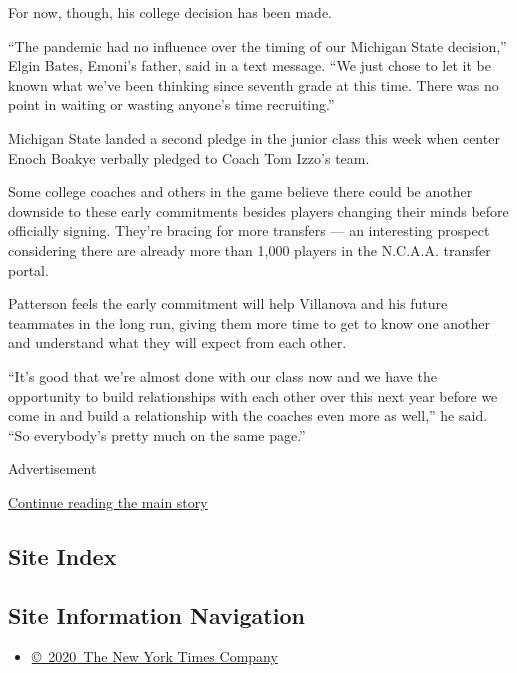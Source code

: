 For now, though, his college decision has been made.

``The pandemic had no influence over the timing of our Michigan State
decision,'' Elgin Bates, Emoni's father, said in a text message. ``We
just chose to let it be known what we've been thinking since seventh
grade at this time. There was no point in waiting or wasting anyone's
time recruiting.''

Michigan State landed a second pledge in the junior class this week when
center Enoch Boakye verbally pledged to Coach Tom Izzo's team.

Some college coaches and others in the game believe there could be
another downside to these early commitments besides players changing
their minds before officially signing. They're bracing for more
transfers --- an interesting prospect considering there are already more
than 1,000 players in the N.C.A.A. transfer portal.

Patterson feels the early commitment will help Villanova and his future
teammates in the long run, giving them more time to get to know one
another and understand what they will expect from each other.

``It's good that we're almost done with our class now and we have the
opportunity to build relationships with each other over this next year
before we come in and build a relationship with the coaches even more as
well,'' he said. ``So everybody's pretty much on the same page.''

Advertisement

\protect\hyperlink{after-bottom}{Continue reading the main story}

\hypertarget{site-index}{%
\subsection{Site Index}\label{site-index}}

\hypertarget{site-information-navigation}{%
\subsection{Site Information
Navigation}\label{site-information-navigation}}

\begin{itemize}
\tightlist
\item
  \href{https://help.nytimes.com/hc/en-us/articles/115014792127-Copyright-notice}{©~2020~The
  New York Times Company}
\end{itemize}

